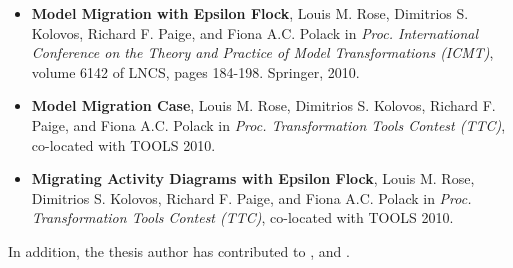 {\begin{itemize}
		\item \textbf{Model Migration with Epsilon Flock}, Louis M. Rose, Dimitrios S. Kolovos, Richard F. Paige, and Fiona A.C. Polack in \textit{Proc. International Conference on the Theory and Practice of Model Transformations (ICMT)}, volume 6142 of LNCS, pages 184-198. Springer, 2010.
	
		\item \textbf{Model Migration Case}, Louis M. Rose, Dimitrios S. Kolovos, Richard F. Paige, and Fiona A.C. Polack in \textit{Proc. Transformation Tools Contest (TTC)}, co-located with TOOLS 2010.
	
		\item \textbf{Migrating Activity Diagrams with Epsilon Flock}, Louis M. Rose, Dimitrios S. Kolovos, Richard F. Paige, and Fiona A.C. Polack in \textit{Proc. Transformation Tools Contest (TTC)}, co-located with TOOLS 2010.	
	\end{itemize}

	In addition, the thesis author has contributed to \cite{kolovos07ewl}, \cite{kolovos07ewlgmf} and \cite{paige08fptc}.
}